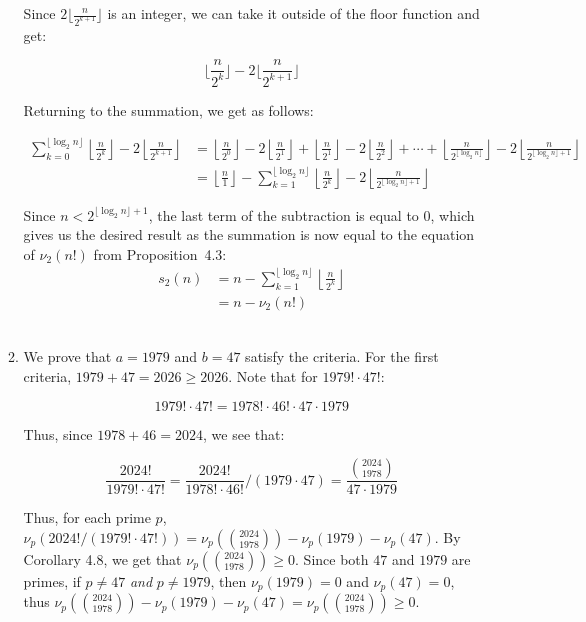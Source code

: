 \documentclass{article}
\begin{document}
\begin{enumerate}[leftmargin=*, label=\arabic*.]
\begin{enumerate}[label=\alph*)]
    Since $2\lfloor \frac{n}{2^{k+1}} \rfloor$ is an integer, we can take it outside of the floor function and get: 

    $$\lfloor \frac{n}{2^k}\rfloor - 2\lfloor \frac{n}{2^{k+1}} \rfloor$$

    Returning to the summation, we get as follows: 

    \begin{align*}
    \sum_{k=0}^{\lfloor \log_2 n \rfloor} \left\lfloor \frac{n}{2^k} \right\rfloor - 2\left\lfloor \frac{n}{2^{k+1}} \right\rfloor 
    &= \left\lfloor \frac{n}{2^0} \right\rfloor - 2\left\lfloor \frac{n}{2^1} \right\rfloor 
    + \left\lfloor \frac{n}{2^1} \right\rfloor - 2\left\lfloor \frac{n}{2^2} \right\rfloor 
    + \cdots 
    + \left\lfloor \frac{n}{2^{\lfloor \log_2 n \rfloor}} \right\rfloor 
    - 2\left\lfloor \frac{n}{2^{\lfloor \log_2 n \rfloor + 1}} \right\rfloor \\
    &= \left\lfloor \frac{n}{1} \right\rfloor - \sum_{k = 1}^{\lfloor \log_2 n \rfloor} \left\lfloor \frac{n}{2^k} \right\rfloor - 2\left\lfloor \frac{n}{2^{\lfloor \log_2 n \rfloor + 1}}\right\rfloor
    \end{align*}
    
    Since $n < 2^{\lfloor \log_2 n \rfloor + 1}$, the last term of the subtraction is equal to $0$, which gives us the desired result as the summation is now equal to the equation of $\nu_2(n!)$ from Proposition~4.3:
    \begin{align*}
        s_2(n) &= n - \sum_{k = 1}^{\lfloor \log_2 n \rfloor} \left\lfloor \frac{n}{2^k} \right\rfloor \\
               &= n - \nu_2(n!)
    \end{align*}\\

    \item 
    We prove that $a = 1979$ and $b = 47$ satisfy the criteria. For the first criteria, $1979 + 47 = 2026 \geq 2026$. Note that for $1979! \cdot 47!$:
    
    $$1979! \cdot 47! = 1978! \cdot 46! \cdot 47 \cdot 1979$$
    
    Thus, since $1978 + 46 = 2024$, we see that:
    
    $$\frac{2024!}{1979! \cdot 47!} = \frac{2024!}{1978! \cdot 46!} / (1979 \cdot 47) = \frac{\binom{2024}{1978}}{47 \cdot 1979}$$
    
    Thus, for each prime $p$, $\nu_p(2024!/(1979! \cdot 47!)) = \nu_p(\binom{2024}{1978}) - \nu_p(1979) - \nu_p(47)$. By Corollary 4.8, we get that $\nu_p(\binom{2024}{1978}) \geq 0$. Since both $47$ and $1979$ are primes, if $p \neq 47$ \textit{and} $p \neq 1979$, then $\nu_p(1979) = 0$ and $\nu_p(47) = 0$, thus $\nu_p(\binom{2024}{1978}) - \nu_p(1979) - \nu_p(47) = \nu_p(\binom{2024}{1978}) \geq 0$. \\
    

\end{enumerate}
\end{enumerate}
\end{document}
